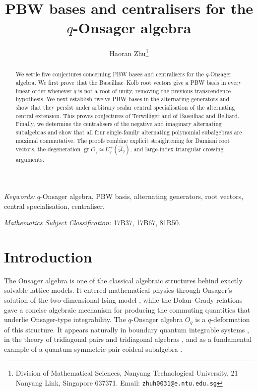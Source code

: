 \documentclass[11pt]{extarticle}
\theoremstyle{definition}
\theoremstyle{remark}
\numberwithin{equation}{section}
\newcommand{\Oq}{O_q}
\newcommand{\Uplus}{U_q^+(\widehat{\mathfrak{sl}}_2)}
\newcommand{\gr}{\operatorname{gr}}
\begin{document}
\title{PBW bases and centralisers for the $q$-Onsager algebra}

\author{Haoran Zhu\thanks{Division of Mathematical Sciences,
Nanyang Technological University, 21 Nanyang Link, Singapore 637371.
Email: \texttt{zhuh0031@e.ntu.edu.sg}}}

\date{}

\maketitle

\begin{abstract}
We settle five conjectures concerning PBW bases and centralisers for the
$q$-Onsager algebra.  We first prove that the Baseilhac--Kolb root vectors
give a PBW basis in every linear order whenever $q$ is not a root of unity,
removing the previous transcendence hypothesis.  We next establish twelve
PBW bases in the alternating generators and show that they persist under
arbitrary scalar central specialisation of the alternating central
extension.  This proves conjectures of Terwilliger and of Baseilhac and Belliard.  Finally, we
determine the centralisers of the negative and imaginary alternating
subalgebras and show that all four single-family alternating polynomial
subalgebras are maximal commutative.  The proofs combine explicit
straightening for Damiani root vectors, the degeneration
$\gr\Oq\simeq\Uplus$, and large-index triangular crossing arguments.
\end{abstract}

{\noindent\itshape Keywords:} $q$-Onsager algebra, PBW basis, alternating
generators, root vectors, central specialisation, centraliser.

\medskip

{\noindent\itshape Mathematics Subject Classification:}
17B37, 17B67, 81R50.

\section{Introduction}
\label{sec:introduction}

The Onsager algebra is one of the classical algebraic structures behind
exactly solvable lattice models.  It entered mathematical physics through
Onsager's solution of the two-dimensional Ising model
\cite{Onsager1944}, while the Dolan--Grady relations
\cite{DolanGrady1982} gave a concise algebraic mechanism for producing the
commuting quantities that underlie Onsager-type integrability.  The
$q$-Onsager algebra $\Oq$ is a $q$-deformation of this structure.  It appears
naturally in boundary quantum integrable systems
\cite{Sklyanin1988,Baseilhac2005,BaseilhacKoizumi2005,
BaseilhacBelliard2010,BaseilhacBelliard2013}, in the theory of tridiagonal
pairs and tridiagonal algebras \cite{Terwilliger2001}, and as a fundamental
example of a quantum symmetric-pair coideal subalgebra
\cite{Letzter2002,Kolb2014,LuWang2021,LuRuanWang2023}.
\end{document}
